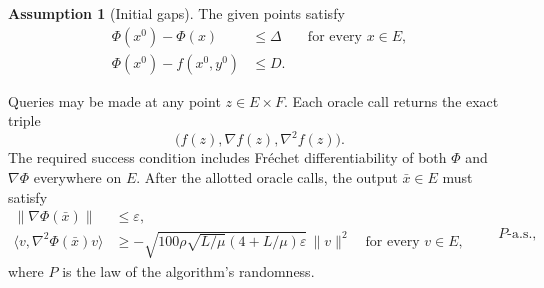 \documentclass[10pt]{article}
\theoremstyle{definition}
\newtheorem{assumption}{Assumption}
\begin{document}
\begin{assumption}[Initial gaps]
The given points satisfy
\[
\begin{aligned}
\Phi(x^0)-\Phi(x)&\leq\Delta
&&\text{for every }x\in E,\\
\Phi(x^0)-f(x^0,y^0)&\leq D.
\end{aligned}
\]
\end{assumption}

Queries may be made at any point $z\in E\times F$. Each oracle call returns the exact triple
\[
\bigl(f(z),\nabla f(z),\nabla^2 f(z)\bigr).
\]
The required success condition includes Fr\'echet differentiability of both $\Phi$ and $\nabla\Phi$ everywhere on $E$. After the allotted oracle calls, the output $\bar{x}\in E$ must satisfy
\[
\begin{aligned}
\|\nabla\Phi(\bar{x})\|&\leq\varepsilon,\\
\langle v,\nabla^2\Phi(\bar{x})v\rangle
&\geq-\sqrt{100\rho\sqrt{L/\mu}(4+L/\mu)\varepsilon}\,\|v\|^2
\quad\text{for every }v\in E,
\end{aligned}
\qquad P\text{-a.s.},
\]
where $P$ is the law of the algorithm's randomness.
\end{document}
